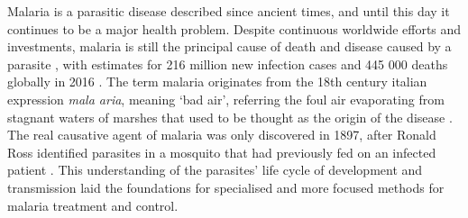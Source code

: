 Malaria is a parasitic disease described since ancient times, and until this day it continues to be a major health problem.
Despite continuous worldwide efforts and investments, malaria is still the principal cause of death and disease caused by a parasite \cite{vitoria2009global}, with estimates for 216 million new infection cases and 445 000 deaths globally in 2016 \cite{who2017world}.
The term malaria originates from the 18th century italian expression \textit{mala aria}, meaning `bad air', referring the foul air evaporating from stagnant waters of marshes that used to be thought as the origin of the disease \cite{warrell2002essential}.
The real causative agent of malaria was only discovered in 1897, after Ronald Ross identified parasites in a mosquito that had previously fed on an infected patient \cite{ross1897observations}.
This understanding of the parasites' life cycle of development and transmission laid the foundations for specialised and more focused methods for malaria treatment and control.

